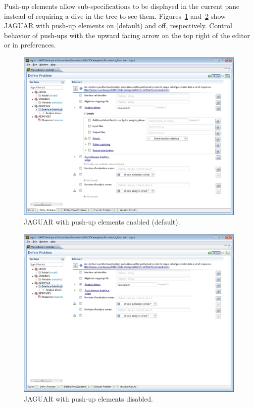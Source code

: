 Push-up elements allow sub-specifications to be displayed in the
current pane instead of requiring a dive in the tree to see them.
Figures~\ref{fig:input:jaguar_pushup_on}
and~\ref{fig:input:jaguar_pushup_off} show JAGUAR with push-up
elements on (default) and off, respectively.  Control behavior of
push-ups with the upward facing arrow on the top right of the editor
or in preferences.

\begin{figure}
  \centering
  \includegraphics[scale=0.4]{images/2_1jaguar_pushup_on}
  \caption{JAGUAR with push-up elements enabled (default).}
  \label{fig:input:jaguar_pushup_on}
\end{figure}

\begin{figure}
  \centering
  \includegraphics[scale=0.4]{images/2_1jaguar_pushup_off}
  \caption{JAGUAR with push-up elements disabled.}
  \label{fig:input:jaguar_pushup_off}
\end{figure}

